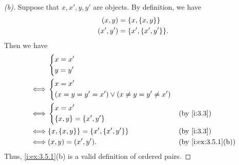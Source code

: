 \begin{proof}[(b)]
  Suppose that \(x, x', y, y'\) are objects.
  By definition, we have
  \begin{align*}
    (x, y)   & = \set{x, \set{x, y}}     \\
    (x', y') & = \set{x', \set{x', y'}}.
  \end{align*}
  Then we have
  \begin{align*}
         & \begin{dcases}
             x = x' \\
             y = y'
           \end{dcases}                                                                \\
    \iff & \begin{dcases}
             x = x' \\
             \pa{x = y = y' = x'} \lor \pa{x \neq y = y' \neq x'}
           \end{dcases}                          \\
    \iff & \begin{dcases}
             x = x' \\
             \set{x, y} = \set{x', y'}
           \end{dcases}                            &  & \by{i:3.3}                      \\
    \iff & \set{x, \set{x, y}} = \set{x', \set{x', y'}}         &  & \by{i:3.3}         \\
    \iff & (x, y) = (x', y').                                   &  & \by{i:ex:3.5.1}[b]
  \end{align*}
  Thus, \cref{i:ex:3.5.1}(b) is a valid definition of ordered pairs.
\end{proof}

